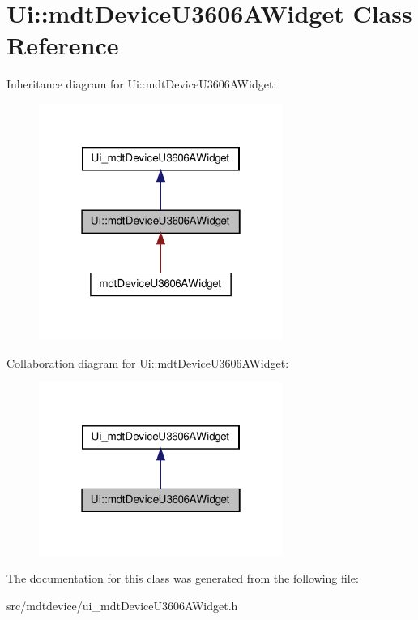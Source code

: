 \hypertarget{class_ui_1_1mdt_device_u3606_a_widget}{
\section{Ui::mdtDeviceU3606AWidget Class Reference}
\label{class_ui_1_1mdt_device_u3606_a_widget}
}


Inheritance diagram for Ui::mdtDeviceU3606AWidget:\nopagebreak
\begin{figure}[H]
\begin{center}
\leavevmode
\includegraphics[width=226pt]{class_ui_1_1mdt_device_u3606_a_widget__inherit__graph}
\end{center}
\end{figure}


Collaboration diagram for Ui::mdtDeviceU3606AWidget:\nopagebreak
\begin{figure}[H]
\begin{center}
\leavevmode
\includegraphics[width=226pt]{class_ui_1_1mdt_device_u3606_a_widget__coll__graph}
\end{center}
\end{figure}


The documentation for this class was generated from the following file:\begin{DoxyCompactItemize}
\item 
src/mdtdevice/ui\_\-mdtDeviceU3606AWidget.h\end{DoxyCompactItemize}
